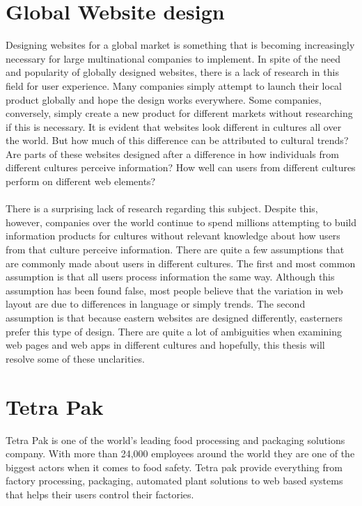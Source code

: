 \section{Global Website design}
Designing websites for a global market is something that is becoming increasingly necessary for large multinational companies to implement. In spite of the need and popularity of globally designed websites, there is a lack of research in this field for user experience. Many companies simply attempt to launch their local product globally and hope the design works everywhere. Some companies, conversely, simply create a new product for different markets without researching if this is necessary. It is evident that websites look different in cultures all over the world. But how much of this difference can be attributed to cultural trends? Are parts of these websites designed after a difference in how individuals from different cultures perceive information? How well can users from different cultures perform on different web elements?
\\\\
There is a surprising lack of research regarding this subject. Despite this, however, companies over the world continue to spend millions attempting to build information products for cultures without relevant knowledge about how users from that culture perceive information. There are quite a few assumptions that are commonly made about users in different cultures. The first and most common assumption is that all users process information the same way. Although this assumption has been found false, most people believe that the variation in web layout are due to differences in language or simply trends. The second assumption is that because eastern websites are designed differently, easterners prefer this type of design. There are quite a lot of ambiguities when examining web pages and web apps in different cultures and hopefully, this thesis will resolve some of these unclarities.

\section{Tetra Pak}
Tetra Pak is one of the world's leading food processing and packaging solutions company.  With more than 24,000 employees around the world they are one of the biggest actors when it comes to food safety. Tetra pak provide everything from factory processing, packaging, automated plant solutions to web based systems that helps their users control their factories.

